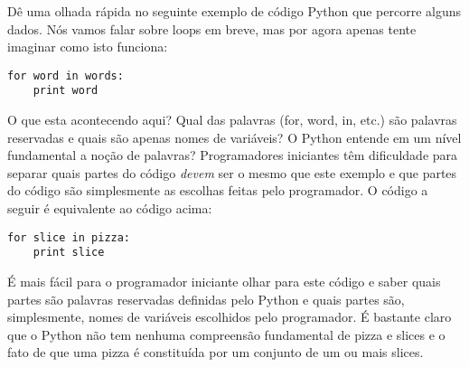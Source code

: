 {{{{{{{{{{{{{{{{{Dê uma olhada rápida no seguinte exemplo de código Python que percorre alguns dados. 
Nós vamos falar sobre loops em breve, mas por agora apenas tente imaginar como isto funciona:

\beforeverb
\begin{verbatim}
for word in words:
    print word
\end{verbatim}
\afterverb
%
O que esta acontecendo aqui? Qual das palavras (for, word, in, etc.) são palavras reservadas 
e quais são apenas nomes de variáveis? O Python entende em um nível fundamental 
a noção de palavras? Programadores iniciantes têm 
dificuldade para separar quais partes 
do código \emph{devem} ser o mesmo que este exemplo e que partes do código são simplesmente 
as escolhas feitas pelo programador.
%
O código a seguir é equivalente ao código acima:
%


\beforeverb
\begin{verbatim}
for slice in pizza:
    print slice
\end{verbatim}
\afterverb
%
É mais fácil para o programador iniciante olhar para este código e saber quais 
partes são palavras reservadas definidas pelo Python e quais partes são, simplesmente, nomes de 
variáveis escolhidos pelo programador. É bastante claro que o Python não tem nenhuma compreensão 
fundamental de pizza e slices e o fato de que uma pizza é constituída por um conjunto 
de um ou mais slices.

}}}}}}}}}}}}}}}}}
